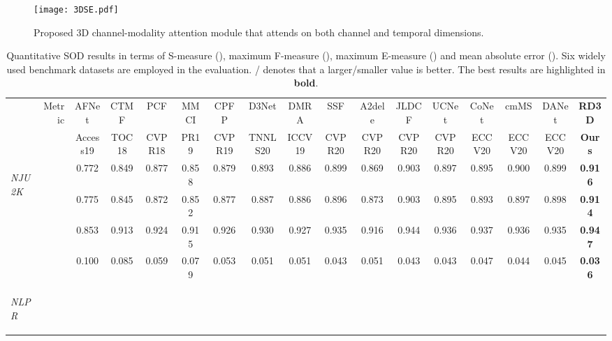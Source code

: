 \documentclass[letterpaper]{article}
\begin{document}
\begin{figure}
	\centering
	\texttt{[image: 3DSE.pdf]}\vspace{-0.3cm}
	\caption{\small Proposed 3D channel-modality attention module that attends on both channel and temporal dimensions.}\vspace{-0.3cm}
	\label{label2}
\end{figure}
\begin{table*}[t!]
	\centering
	\caption{\small Quantitative SOD results in terms of S-measure (), maximum F-measure (), maximum E-measure () and mean absolute error (). Six widely used benchmark datasets are employed in the evaluation.
/ denotes that a larger/smaller value is better. The best results are highlighted in \textbf{bold}.}\vspace{-0.5cm}
	\label{table:QuantitativeResults}
	\vspace{8pt}
\scriptsize
\renewcommand{\arraystretch}{0.7}
	\renewcommand{\tabcolsep}{1.07mm}
	\begin{tabular}{lr|cccccccccccccc||c}
		\hline\toprule
		& \multirow{2}{*}{Metric}   & AFNet & CTMF & PCF & MMCI & CPFP & D3Net & DMRA  &SSF &A2dele  & JLDCF &UCNet &CoNet &cmMS  &DANet  & \textbf{RD3D} \\
		&   &\scriptsize Access19 &\scriptsize TOC18   &\scriptsize CVPR18 &\scriptsize PR19 &\scriptsize CVPR19 &\scriptsize TNNLS20 &\scriptsize ICCV19  &\scriptsize CVPR20 &\scriptsize CVPR20  &\scriptsize CVPR20 &\scriptsize CVPR20  &\scriptsize ECCV20  &\scriptsize ECCV20 &\scriptsize ECCV20 & \textbf{Ours} \\
		\hline
		\multirow{4}{*}{\begin{sideways}\textit{NJU2K}\end{sideways}}
&   & 0.772 & 0.849 & 0.877 & 0.858  & 0.879 & 0.893 & 0.886  & 0.899 &0.869 & 0.903 &0.897 &0.895 &0.900  &0.899  & \bf{0.916}\\
		&      & 0.775 & 0.845 & 0.872 & 0.852  & 0.877 & 0.887 & 0.886 &0.896 &0.873 &0.903 &0.895 &0.893 &0.897 & 0.898 & \bf{0.914} \\
		&     & 0.853 & 0.913 & 0.924 & 0.915  & 0.926 & 0.930 & 0.927 &0.935 &0.916 &0.944 &0.936 &0.937 &0.936  &0.935  &\bf{0.947}  \\
		&  & 0.100 & 0.085 & 0.059 & 0.079  & 0.053 & 0.051 & 0.051 &0.043   &0.051 &0.043  &0.043 &0.047 &0.044 &0.045  &\bf{0.036} \\
		\midrule
		\multirow{4}{*}{\begin{sideways}\textit{NLPR}\end{sideways}}

\end{tabular}
\end{table*}
\end{document}
